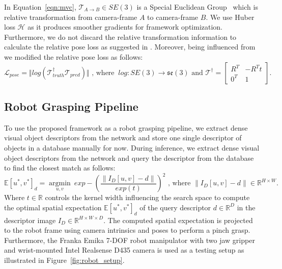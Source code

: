 In Equation~\ref{eqn:mvc}, $ \mathcal{T}_{A \rightarrow B} \in SE(3)$ is a Special Euclidean Group~\cite{thurston2014three} which
is relative transformation from camera-frame $A$ to camera-frame $B$. We use Huber loss $\mathcal{H}$ as it produces smoother gradients for framework optimization.
Furthermore, we do not discard the relative transformation information to calculate the relative pose loss as suggested in \cite{suwajanakorn2018discovery}.
Moreover, being influenced from \cite{zhao2020learning} we modified the relative pose loss as follows:
\begin{equation}
    \mathcal{L}_{pose} = \Vert log(\mathcal{T}_{truth}^{\dagger} \mathcal{T}_{pred}) \Vert \text{ , where  } \ log: SE(3) \rightarrow \mathfrak{se}(3) \text{ and } \mathcal{T}^{\dagger} = \begin{bmatrix}
        R^T & -R^T t \\
        0^T & 1
    \end{bmatrix}.
\end{equation}


\subsection{Robot Grasping Pipeline}
To use the proposed framework as a robot grasping pipeline, we extract dense visual object descriptors from the network and store
one single descriptor of objects in a database manually for now. During inference, we extract dense visual object descriptors from the network and
query the descriptor from the database to find the closest match as follows:
\begin{equation}
    \label{eqn:gaussian_kernel}
    \mathbb{E}{[u^*, v^*]_{d}} = \operatorname*{argmin}_{u, v} \ exp-\left(\dfrac{\|I_D[u, v] - d\|}{exp(t)}\right)^2 \text{ , where  } \|I_D[u, v] - d\| \in \mathbb{R}^{H \times W}.
\end{equation}
Where $t \in \mathbb{R}$ controls the kernel width influencing the search space to compute the optimal spatial expectation $\mathbb{E}{[u^*, v^*]_{d}}$ of
the query descriptor $d \in \mathbb{R}^D$ in the descriptor image $I_D \in \mathbb{R}^{H \times W \times D}$. The computed spatial expectation is projected to the robot frame using camera intrinsics and poses to perform a pinch grasp.
Furthermore, the Franka Emika 7-DOF robot manipulator with two jaw gripper and wrist-mounted Intel Realsense D435 camera is used as a testing setup as illustrated in Figure~\ref{fig:robot_setup}.

